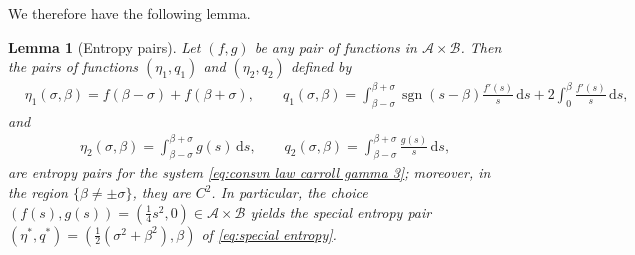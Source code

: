 \documentclass[11pt,a4paper,reqno]{amsart}
\numberwithin{equation}{section}
\newtheorem{lemma}{Lemma}[section]
\theoremstyle{definition}
\theoremstyle{remark}
\renewcommand{\d}{\, \mathrm{d}}
\DeclareMathOperator\sgn{sgn}
\begin{document}
{We therefore have the following lemma.
%
\begin{lemma}[Entropy pairs]\label{lem:ent pairs}
    Let $(f,g)$ be any pair of functions in $\mathcal{A} \times \mathcal{B}$. Then the pairs of functions $(\eta_1,q_1)$ and $(\eta_2,q_2)$ defined by 
    \begin{align}
    &\eta_1(\sigma,\beta) = f(\beta-\sigma) + f(\beta+\sigma) , \qquad q_1(\sigma,\beta) = \int_{\beta-\sigma}^{\beta+\sigma} \sgn(s-\beta) \frac{f'(s)}{s} \d s + 2 \int_{0}^\beta \frac{f'(s)}{s} \d s, \nonumber
    \end{align}
    and 
  \begin{align}
    &\eta_2(\sigma,\beta) = \int_{\beta-\sigma}^{\beta+\sigma} g(s) \d s, \qquad q_2(\sigma,\beta) = \int_{\beta-\sigma}^{\beta+\sigma} \frac{g(s)}{s} \d s, \nonumber
    \end{align}
    are entropy pairs for the system \eqref{eq:consvn law carroll gamma 3}; moreover, in the region $\{\beta \neq \pm \sigma\}$, they are $C^2$. In particular, the choice $(f(s),g(s)) = (\frac{1}{4}s^2,0) \in \mathcal{A} \times \mathcal{B}$ yields the special entropy pair $(\eta^*,q^*) = (\frac{1}{2}(\sigma^2 + \beta^2), \beta)$ of \eqref{eq:special entropy}.
\end{lemma}



}
\end{document}
